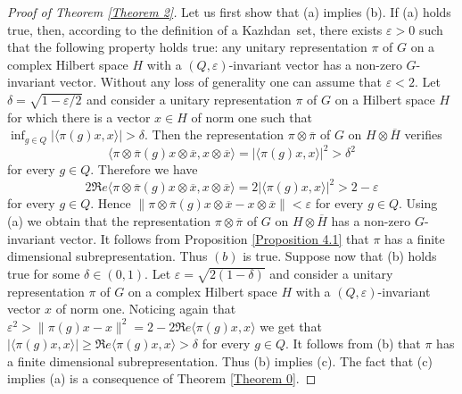 \documentclass[11pt,english,a4paper]{smfart}
\numberwithin{equation}{section}
\theoremstyle{definition}
\begin{document}
\begin{proof}[Proof of Theorem \ref{Theorem 2}]
Let us first show that (a) implies (b). If (a) holds true, then, according to the definition of a {Kazhdan}\ set, there exists $\varepsilon >0$ such that the following property holds true:
any unitary representation $\pi $ of $G$ on a complex Hilbert space $H$ 
with a 
$({Q},\varepsilon )$-invariant vector has a non-zero $G$-invariant vector. Without any loss of generality one can assume that $\varepsilon < 2$. Let 
$\delta = \sqrt{1-{\varepsilon}/{2}}$ 
and consider a unitary representation $\pi$ of $G$ on a Hilbert space $H$ for 
which there is a vector $x\in H$ of norm one such that 
$\inf_{g\in{Q}}\left|{\ensuremath{{\langle {\pi(g)x},{x}\rangle}}}\right|  > \delta.$
Then the representation $\pi {\otimes} {\overline{{\pi }}}$ of 
$G$ on $H{\otimes} {\overline{{H}}}$ verifies
\[
{\ensuremath{{\langle {\pi {\otimes}{\overline{{\pi }}}(g)x {\otimes}{\overline{{x }}}},{x 
{\otimes}{\overline{{x }}}}\rangle}}}=|{\ensuremath{{\langle {\pi (g)x },{x }\rangle}}}|^{2} > \delta^2
\]
for every $g\in{Q}$.
Therefore we have 
\[
2\Re e{\ensuremath{{\langle {\pi {\otimes}{\overline{{\pi }}}(g)x {\otimes}{\overline{{x }}}},{x 
{\otimes}{\overline{{x }}}}\rangle}}}=2|{\ensuremath{{\langle {\pi (g)x },{x }\rangle}}}|^{2} > 2 - \varepsilon
\]
for every $g\in{Q}$. Hence
$
\left\|\pi {\otimes}{\overline{{\pi }}}(g)x {\otimes}{\overline{{x }}} - x {\otimes}{\overline{{x }}}\right\| < \varepsilon
$
for every $g\in{Q}$. Using (a) we obtain that the representation $\pi {\otimes} {\overline{{\pi }}}$ of 
$G$ on $H{\otimes} {\overline{{H}}}$ has a non-zero \mbox{$G$-invariant} vector. It follows from Proposition \ref{Proposition 4.1}  that $\pi$ has a finite dimensional subrepresentation. Thus $(b)$ is true.
Suppose now that (b) holds true for some $\delta \in (0,1)$. Let 
$\varepsilon = \sqrt{2(1-\delta)}$ 
and consider a unitary representation $\pi $ of $G$ on a complex Hilbert space $H$ 
with a $({Q},\varepsilon )$-invariant vector $x$ of norm one. Noticing again that 
$\varepsilon^2 > \|\pi(g)x-x\|^2 = 2-2\Re e{\ensuremath{{\langle {\pi (g)x },{x }\rangle}}}$
we get that
$ \left|{\ensuremath{{\langle {\pi (g)x },{x }\rangle}}}\right| \ge \Re e{\ensuremath{{\langle {\pi (g)x },{x }\rangle}}} > \delta$
for every $g\in{Q}$. It follows from (b)  that $\pi$ has a finite dimensional subrepresentation. Thus (b) implies (c).
The fact that (c) implies (a) is a consequence of Theorem \ref{Theorem 0}.
\end{proof}
\end{document}
